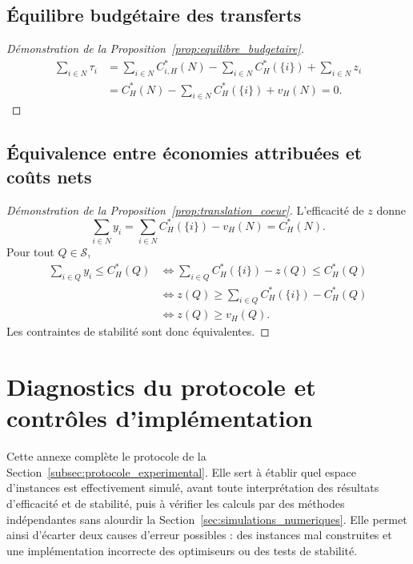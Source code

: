 \subsection{Équilibre budgétaire des transferts}
\label{app:preuve_equilibre_budgetaire}

\begin{proof}[Démonstration de la Proposition~\ref{prop:equilibre_budgetaire}]
\begin{align*}
\sum_{i\in N}\tau_i
&=
\sum_{i\in N}C_{i,H}^*(N)
-
\sum_{i\in N}C_H^*(\{i\})
+
\sum_{i\in N}z_i\\
&=
C_H^*(N)-\sum_{i\in N}C_H^*(\{i\})+v_H(N)
=
0.
\end{align*}
\end{proof}

\subsection{Équivalence entre économies attribuées et coûts nets}
\label{app:preuve_translation_coeur}

\begin{proof}[Démonstration de la Proposition~\ref{prop:translation_coeur}]
L'efficacité de \(z\) donne
\[
\sum_{i\in N}y_i
=
\sum_{i\in N}C_H^*(\{i\})-v_H(N)
=
C_H^*(N).
\]
Pour tout \(Q\in\mathcal S\),
\begin{align*}
\sum_{i\in Q}y_i\leqslant C_H^*(Q)
&\Longleftrightarrow
\sum_{i\in Q}C_H^*(\{i\})-z(Q)\leqslant C_H^*(Q)\\
&\Longleftrightarrow
z(Q)\geqslant
\sum_{i\in Q}C_H^*(\{i\})-C_H^*(Q)\\
&\Longleftrightarrow
z(Q)\geqslant v_H(Q).
\end{align*}
Les contraintes de stabilité sont donc équivalentes.
\end{proof}

\section{Diagnostics du protocole et contrôles d'implémentation}
\label{app:diagnostics_protocole}

Cette annexe complète le protocole de la
Section~\ref{subsec:protocole_experimental}. Elle sert à établir quel espace
d'instances est effectivement simulé, avant toute interprétation des résultats
d'efficacité et de stabilité, puis à vérifier les calculs par des méthodes
indépendantes sans alourdir la Section~\ref{sec:simulations_numeriques}.
Elle permet ainsi d'écarter deux causes d'erreur possibles : des instances
mal construites et une implémentation incorrecte des optimiseurs ou des tests
de stabilité.

